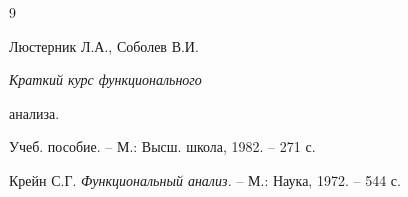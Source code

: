\begin{thebibliography}{9}







Люстерник Л.А., Соболев В.И. {\em Краткий курс функционального


анализа.} Учеб. пособие. -- М.: Высш. школа, 1982. -- 271 с.







Крейн С.Г. {\em Функциональный анализ. } -- М.: Наука, 1972. -- 544 с.





\end{thebibliography}





\vskip 2cm












\label{end}





